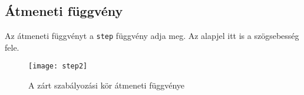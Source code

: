 
\subsection{Átmeneti függvény}

Az átmeneti függvényt a \verb|step| függvény adja meg.
Az alapjel itt is a szögsebesség fele.

\begin{figure}[H]
	\centering
	\texttt{[image: step2]}
	\caption{A zárt szabályozási kör átmeneti függvénye}
	\label{fig:step2}
\end{figure}

